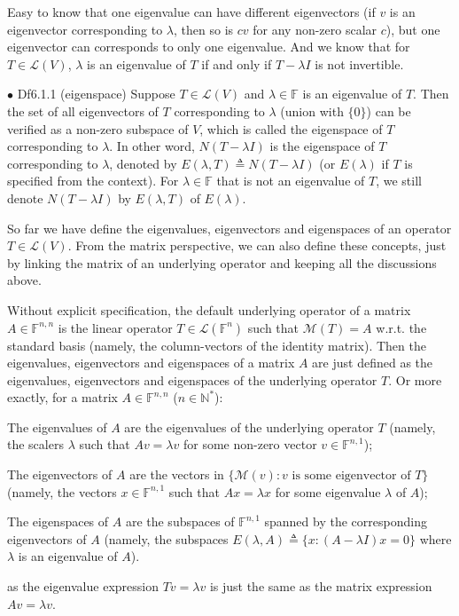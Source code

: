 \documentclass{article}
\begin{document}
\begin{Rmk}{}
    Easy to know that \textcolor{Th}{one eigenvalue can have different eigenvectors (if $v$ is an eigenvector corresponding to $\lambda$, then so is $cv$ for any non-zero scalar $c$), but one eigenvector can corresponds to only one eigenvalue.} And we know that \textcolor{Th}{for $T\in\mathcal{L}(V)$, $\lambda$ is an eigenvalue of $T$ if and only if $T-\lambda I$ is not invertible.}
\end{Rmk}

\begin{Df}{$\bullet$ Df6.1.1 (eigenspace)}
    Suppose $T\in\mathcal{L}(V)$ and $\lambda\in\mathbb{F}$ is an eigenvalue of $T$. \textcolor{Th}{Then the set of all eigenvectors of $T$ corresponding to $\lambda$ (union with $\{0\}$) can be verified as a non-zero subspace of $V$}, which is called the eigenspace of $T$ corresponding to $\lambda$. In other word, $N(T-\lambda I)$ is the eigenspace of $T$ corresponding to $\lambda$, denoted by $E(\lambda, T)\triangleq N(T-\lambda I)$ (or $E(\lambda)$ if $T$ is specified from the context). \textcolor{Df}{For $\lambda\in\mathbb{F}$ that is not an eigenvalue of $T$, we still denote $N(T-\lambda I)$ by $E(\lambda, T)$ of $E(\lambda)$.}
\end{Df}

\begin{Rmk}{}
    So far we have define the eigenvalues, eigenvectors and eigenspaces of an operator $T\in\mathcal{L}(V)$. From the matrix perspective, we can also define these concepts, just by linking the matrix of an underlying operator and keeping all the discussions above. \textcolor{Df}{Without explicit specification, the default underlying operator of a matrix $A\in\mathbb{F}^{n,n}$ is the linear operator $T\in\mathcal{L}(\mathbb{F}^n)$ such that $\mathcal{M}(T)=A$ w.r.t. the standard basis (namely, the column-vectors of the identity matrix). Then the eigenvalues, eigenvectors and eigenspaces of a matrix $A$ are just defined as the eigenvalues, eigenvectors and eigenspaces of the underlying operator $T$. Or more exactly, for a matrix $A\in\mathbb{F}^{n,n}$ ($n\in\mathbb{N}^\ast$):
    \begin{compactenum}
        \item The eigenvalues of $A$ are the eigenvalues of the underlying operator $T$ (namely, the scalers $\lambda$ such that $Av = \lambda v$ for some non-zero vector $v\in\mathbb{F}^{n,1}$);
        \item The eigenvectors of $A$ are the vectors in $\{\mathcal{M}(v): v \text{ is some eigenvector of } T\}$ (namely, the vectors $x\in\mathbb{F}^{n,1}$ such that $Ax=\lambda x$ for some eigenvalue $\lambda$ of $A$);
        \item The eigenspaces of $A$ are the subspaces of $\mathbb{F}^{n,1}$ spanned by the corresponding eigenvectors of $A$ (namely, the subspaces $E(\lambda, A)\triangleq \{x: (A-\lambda I)x=0\}$ where $\lambda$ is an eigenvalue of $A$).
    \end{compactenum}
    } as the eigenvalue expression $Tv=\lambda v$ is just the same as the matrix expression $Av=\lambda v$.
\end{Rmk}
\end{document}
